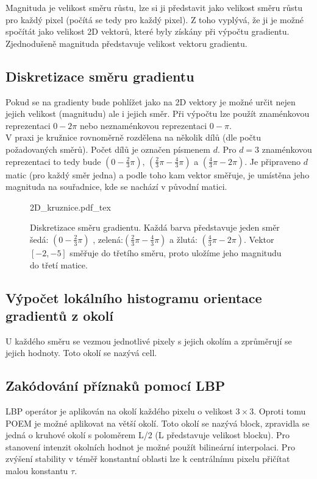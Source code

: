 \documentclass[czech,BP]{thesiskiv}
\begin{document}
Magnituda je velikost směru růstu, lze si ji představit jako velikost směru růstu pro každý pixel (počítá se tedy pro každý pixel).  Z toho vyplývá, že ji je možné spočítát jako velikost 2D vektorů, které byly získány při výpočtu gradientu. Zjednodušeně magnituda představuje velikost vektoru gradientu. \\

\subsection{Diskretizace směru gradientu}
Pokud se na gradienty bude pohlížet jako na 2D vektory je možné určit nejen jejich velikost (magnitudu) ale i jejich směr. Při výpočtu lze použít znaménkovou reprezentaci $0 - 2\pi$ nebo neznaménkovou reprezentaci $0 - \pi$. \\
V praxi je kružnice rovnoměrně rozdělena na několik dílů (dle počtu požadovaných směrů). Počet dílů  je označen písmenem $d$. Pro $d = 3$ znaménkovou reprezentaci to tedy bude $\left(0 - \frac{2}{3}\pi \right)$, $\left(\frac{2}{3}\pi - \frac{4}{3}\pi \right)$ a $\left(\frac{4}{3}\pi - 2\pi \right)$. Je připraveno $d$ matic (pro každý směr jedna) a podle toho kam vektor směřuje, je umístěna jeho magnituda na souřadnice, kde se nachází v původní matici. 

\begin{figure}[H]
    \centering    
    \def\svgwidth{230pt}
	{2D_kruznice.pdf_tex}    
    \caption{Diskretizace směru gradientu. Každá barva představuje jeden směr šedá: $\left(0 - \frac{2}{3}\pi \right)$ , zelená:$\left(\frac{2}{3}\pi - \frac{4}{3}\pi \right)$ a žlutá: $\left(\frac{4}{3}\pi - 2\pi \right)$. Vektor $[ -2, -5 ]$ směřuje do třetího směru, proto uložíme jeho magnitudu do třetí matice. }
    \label{fig: 2D_graf}
\end{figure}

\subsection{Výpočet lokálního histogramu orientace gradientů z okolí}
U každého směru  se vezmou jednotlivé pixely s jejich okolím a zprůměrují se jejich hodnoty. Toto okolí se nazývá cell. \\

\subsection{Zakódování příznaků pomocí LBP}
\par LBP operátor je aplikován na okolí každého pixelu o velikost $3 \times 3$. Oproti tomu POEM je možné aplikovat na větší okolí. Toto okolí se nazývá block, zpravidla se jedná o kruhové okolí s poloměrem L/2 (L představuje velikost blocku). Pro stanovení intenzit okolních hodnot je možné použít bilineární interpolaci. Pro zvýšení stability v téměř konstantní oblasti lze k centrálnímu pixelu přičítat malou konstantu $\tau$. 
\end{document}
